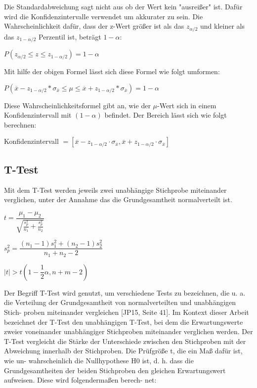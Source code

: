 Die Standardabweichung sagt nicht aus ob der Wert kein "ausreißer" ist. Dafür wird die Konfidenzintervalle verwendet
um akkurater zu sein.
Die Wahrscheinlichkeit dafür, dass der z-Wert
größer ist als das $z_{\alpha/2}$ und kleiner
als das $z_{1-\alpha/2}$ Perzentil ist, beträgt $1 - \alpha$:

\begin{center}
  $P(z_{\alpha/2} \leq z \leq z_{1-\alpha/2}) = 1 - \alpha$
\end{center}

Mit hilfe der obigen Formel lässt sich diese Formel wie folgt umformen:

\begin{center}
  $P(\overline{x} - z_{1-\alpha/2} * \sigma_{\overline{x}} \leq \mu \leq \overline{x} + z_{1-\alpha/2} * \sigma_{\overline{x}}) = 1 - \alpha$
\end{center}

Diese Wahrscheinlichkeitsformel gibt an, wie der $\mu$-Wert sich in einem Konfidenzintervall mit $(1 - \alpha)$ befindet.
Der Bereich lässt sich wie folgt berechnen:

\begin{center}
  Konfidenzintervall $= [\overline{x} - z_{1-\alpha / 2} \cdot \sigma_{\overline{x}}, \overline{x} + z_{1-\alpha / 2} \cdot \sigma_{\overline{x}}]$
\end{center}

\subsection{T-Test}
Mit dem T-Test werden jeweils zwei unabhängige Stichprobe miteinander verglichen, 
unter der Annahme das die Grundgesamtheit normalverteilt ist.

\begin{center}
  $t = \dfrac{\mu_1-\mu_2}{\sqrt{\frac{s_p^2}{n_1} + \frac{s_p^2}{n_2}}}$
\end{center}

\begin{center}
  $s^2_p = \dfrac{(n_1 - 1)s^2_1 + (n_2 - 1)s^2_2}{n_1 + n_2 - 2}$
\end{center}

\begin{center}
  $|t| > t(1 - \dfrac{1}{2}\alpha, n + m - 2)$
\end{center}

Der Begriff T-Test wird genutzt, um verschiedene Tests zu bezeichnen, die
u. a. die Verteilung der Grundgesamtheit von normalverteilten und unabhängigen Stich-
proben miteinander vergleichen [JP15, Seite 41]. Im Kontext dieser Arbeit bezeichnet
der T-Test den unabhängigen T-Test, bei dem die Erwartungswerte zweier voneinander
unabhängiger Stichproben miteinander verglichen werden.
Der T-Test vergleicht die Stärke der Unterschiede zwischen den Stichproben mit der
Abweichung innerhalb der Stichproben. Die Prüfgröße t, die ein Maß dafür ist, wie un-
wahrscheinlich die Nullhypothese H0 ist, d. h. dass die Grundgesamtheiten der beiden
Stichproben den gleichen Erwartungswert aufweisen. Diese wird folgendermaßen berech-
net:
